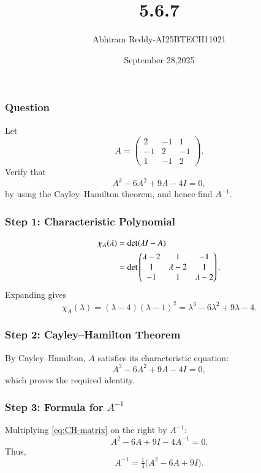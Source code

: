 \documentclass{beamer}
\title 
{5.6.7}
\date{September 28,2025}
\author 
{Abhiram Reddy-AI25BTECH11021}
\begin{document}
\frame{\titlepage}


\begin{frame}
\frametitle{Question}
Let
\[
A=\begin{pmatrix}
2 & -1 & 1\\
-1 & 2 & -1\\
1 & -1 & 2
\end{pmatrix}.
\]
Verify that
\begin{equation}\label{eq:CH}
A^{3}-6A^{2}+9A-4I=0,
\end{equation}
by using the Cayley--Hamilton theorem, and hence find \(A^{-1}\).
\end{frame}

\begin{frame}
\frametitle{Step 1: Characteristic Polynomial}
\begin{align}
\chi_A(\lambda)&=\det(\lambda I - A)\notag\\
&=\det\begin{pmatrix}
\lambda-2 & 1 & -1\\
1 & \lambda-2 & 1\\
-1 & 1 & \lambda-2
\end{pmatrix}. \label{eq:char-det}
\end{align}
Expanding gives
\begin{equation}\label{eq:char-factor}
\chi_A(\lambda)=(\lambda-4)(\lambda-1)^{2}
=\lambda^{3}-6\lambda^{2}+9\lambda-4.
\end{equation}
\end{frame}

\begin{frame}
\frametitle{Step 2: Cayley--Hamilton Theorem}
By Cayley--Hamilton, \(A\) satisfies its characteristic equation:
\begin{equation}\label{eq:CH-matrix}
A^{3}-6A^{2}+9A-4I=0,
\end{equation}
which proves the required identity.
\end{frame}

\begin{frame}
\frametitle{Step 3: Formula for \(A^{-1}\)}
Multiplying \eqref{eq:CH-matrix} on the right by \(A^{-1}\):
\begin{equation}\label{eq:pre-inv}
A^{2}-6A+9I-4A^{-1}=0.
\end{equation}
Thus,
\begin{equation}\label{eq:inv-formula}
A^{-1}=\tfrac{1}{4}\bigl(A^{2}-6A+9I\bigr).
\end{equation}
\end{frame}
\end{document}
